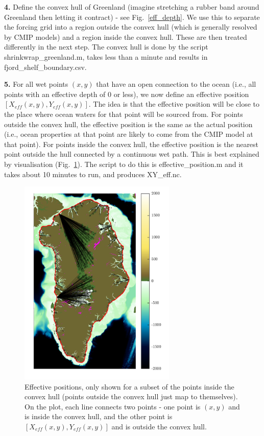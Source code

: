 \documentclass[11pt]{article}
\begin{document}
\textbf{4.} Define the convex hull of Greenland (imagine stretching a rubber band around Greenland then letting it contract) - see Fig.~\ref{eff_depth}. We use this to separate the forcing grid into a region outside the convex hull (which is generally resolved by CMIP models) and a region inside the convex hull. These are then treated differently in the next step. The convex hull is done by the script shrinkwrap\_greenland.m, takes less than a minute and results in fjord\_shelf\_boundary.csv.

\textbf{5.} For all wet points $(x,y)$ that have an open connection to the ocean (i.e., all points with an effective depth of 0 or less), we now define an effective position $[X_{eff}(x,y), Y_{eff}(x,y)]$. The idea is that the effective position will be close to the place where ocean waters for that point will be sourced from. For points outside the convex hull, the effective position is the same as the actual position (i.e., ocean properties at that point are likely to come from the CMIP model at that point). For points inside the convex hull, the effective position is the nearest point outside the hull connected by a continuous wet path. This is best explained by visualisation (Fig.~\ref{eff_pos}). The script to do this is effective\_position.m and it takes about 10 minutes to run, and produces XY\_eff.nc.

\begin{figure}[h!]
\centering
\includegraphics[width=7.5cm]{effective_positions.png}
\caption{Effective positions, only shown for a subset of the points inside the convex hull (points outside the convex hull just map to themselves). On the plot, each line connects two points - one point is $(x,y)$ and is inside the convex hull, and the other point is $[X_{eff}(x,y), Y_{eff}(x,y)]$ and is outside the convex hull.}
\label{eff_pos}
\end{figure}
\end{document}
